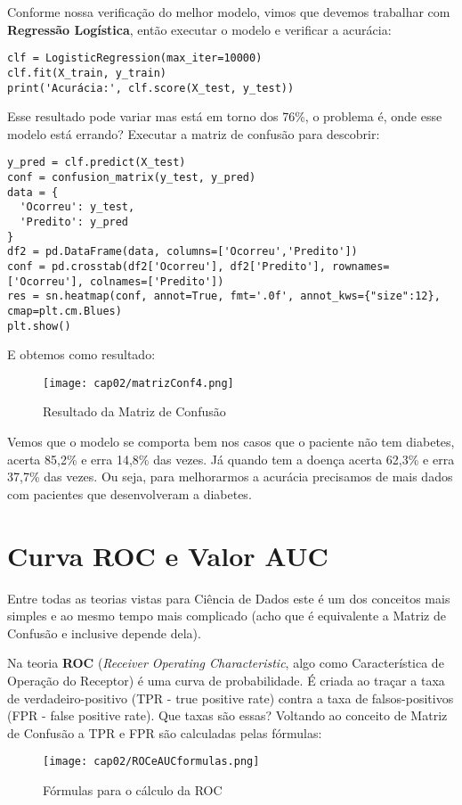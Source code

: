 Conforme nossa verificação do melhor modelo, vimos que devemos trabalhar com \textbf{Regressão Logística}, então executar o modelo e verificar a acurácia:
\begin{lstlisting}[]
clf = LogisticRegression(max_iter=10000)
clf.fit(X_train, y_train)
print('Acurácia:', clf.score(X_test, y_test))
\end{lstlisting}

Esse resultado pode variar mas está em torno dos 76\%, o problema é, onde esse modelo está errando? Executar a matriz de confusão para descobrir:
\begin{lstlisting}[]
y_pred = clf.predict(X_test)
conf = confusion_matrix(y_test, y_pred)
data = {
  'Ocorreu': y_test,
  'Predito': y_pred
}
df2 = pd.DataFrame(data, columns=['Ocorreu','Predito'])
conf = pd.crosstab(df2['Ocorreu'], df2['Predito'], rownames=['Ocorreu'], colnames=['Predito'])
res = sn.heatmap(conf, annot=True, fmt='.0f', annot_kws={"size":12}, cmap=plt.cm.Blues)
plt.show()
\end{lstlisting}

E obtemos como resultado:
\begin{figure}[H]
	\centering
	\texttt{[image: cap02/matrizConf4.png]}
	\caption{Resultado da Matriz de Confusão}
\end{figure}

Vemos que o modelo se comporta bem nos casos que o paciente não tem diabetes, acerta 85,2\% e erra 14,8\% das vezes. Já quando tem a doença acerta 62,3\% e erra 37,7\% das vezes. Ou seja, para melhorarmos a acurácia precisamos de mais dados com pacientes que desenvolveram a diabetes.

\section{Curva ROC e Valor AUC}
Entre todas as teorias vistas para Ciência de Dados este é um dos conceitos mais simples e ao mesmo tempo mais complicado (acho que é equivalente a Matriz de Confusão e inclusive depende dela).

Na teoria \textbf{ROC} (\textit{Receiver Operating Characteristic}, algo como Característica de Operação do Receptor) é uma curva de probabilidade. É criada ao traçar a taxa de verdadeiro-positivo (TPR - true positive rate) contra a taxa de falsos-positivos (FPR - false positive rate). Que taxas são essas? Voltando ao conceito de Matriz de Confusão a TPR e FPR são calculadas pelas fórmulas:
\begin{figure}[H]
	\centering
	\texttt{[image: cap02/ROCeAUCformulas.png]}
	\caption{Fórmulas para o cálculo da ROC}
\end{figure}

